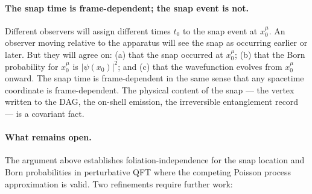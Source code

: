 \documentclass[11pt,a4paper]{article}
\theoremstyle{plain}
\theoremstyle{definition}
\theoremstyle{remark}
\begin{document}
\paragraph{The snap time is frame-dependent; the snap event is not.}
Different observers will assign different times $t_0$ to the snap event at
$x_0^\mu$. An observer moving relative to the apparatus will see the snap as
occurring earlier or later. But they will agree on: (a) that the snap occurred at
$x_0^\mu$; (b) that the Born probability for $x_0^\mu$ is $|\psi(x_0)|^2$; and
(c) that the wavefunction evolves from $x_0^\mu$ onward. The snap time is
frame-dependent in the same sense that any spacetime coordinate is
frame-dependent. The physical content of the snap --- the vertex written to the
DAG, the on-shell emission, the irreversible entanglement record --- is a
covariant fact.

\paragraph{What remains open.}
The argument above establishes foliation-independence for the snap location and
Born probabilities in perturbative QFT where the competing Poisson process
approximation is valid. Two refinements require further work:
\end{document}
